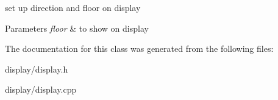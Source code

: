 set up direction and floor on display 


\begin{DoxyParams}{Parameters}
{\em floor} & to show on display \\
\hline
\end{DoxyParams}


The documentation for this class was generated from the following files\+:\begin{DoxyCompactItemize}
\item 
display/display.\+h\item 
display/display.\+cpp\end{DoxyCompactItemize}
